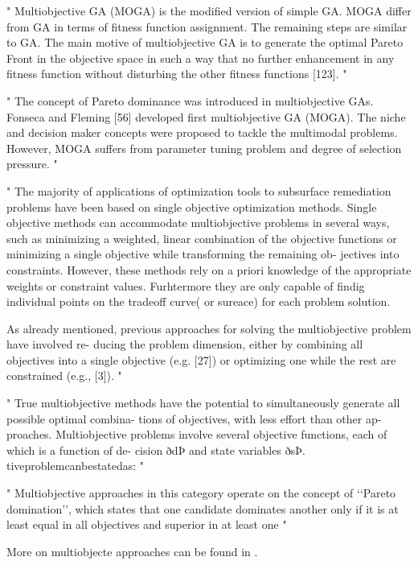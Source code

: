 "
Multiobjective GA (MOGA) is the modified version of simple GA. MOGA differ from GA in terms of fitness function assignment. The remaining steps are similar to GA. The main motive of multiobjective GA is to generate the optimal Pareto Front in the objective space in such a way that no further enhancement in any fitness function without disturbing the other fitness functions [123].
"\cite{katoch_review_2021}


"
The concept of Pareto dominance was introduced in multiobjective GAs. Fonseca and Fleming [56] developed first multiobjective GA (MOGA). The niche and decision maker concepts were proposed to tackle the multimodal problems. However, MOGA suffers from parameter tuning problem and degree of selection pressure.
"\cite{katoch_review_2021}

"
The majority of applications of optimization tools to subsurface remediation problems have been based on single objective optimization methods. Single objective methods can accommodate multiobjective problems in several ways, such as minimizing a weighted, linear combination of the objective functions or minimizing a single objective while transforming the remaining ob- jectives into constraints. However, these methods rely on a priori knowledge of the appropriate weights or constraint values. Furhtermore they are only capable of findig individual points on the tradeoff curve( or sureace) for each problem solution.




As already mentioned, previous approaches for solving the multiobjective problem have involved re- ducing the problem dimension, either by combining all objectives into a single objective (e.g. [27]) or optimizing one while the rest are constrained (e.g., [3]).
"\cite{erickson_multi-objective_2002}

"
True multiobjective methods have the potential to simultaneously generate all possible optimal combina- tions of objectives, with less effort than other ap- proaches. Multiobjective problems involve several objective functions, each of which is a function of de- cision ðdÞ and state variables ðsÞ. tiveproblemcanbestatedas:
"\cite{erickson_multi-objective_2002}

"
Multiobjective approaches in this category operate on the concept of ‘‘Pareto domination’’, which states that one candidate dominates another only if it is at least equal in all objectives and superior in at least one
"\cite{erickson_multi-objective_2002}


More on multiobjecte approaches can be found in \cite{erickson_multi-objective_2002}.

